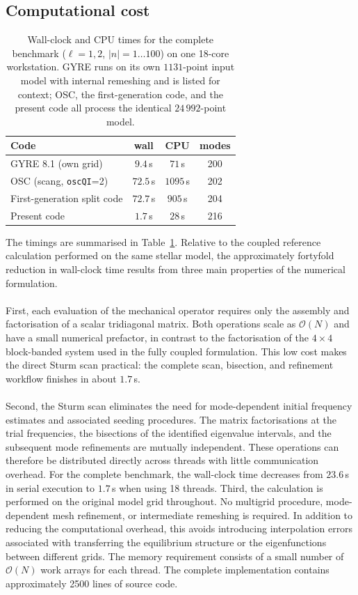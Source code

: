 \documentclass[]{aa}
\begin{document}
\subsection{Computational cost}
\label{sec:performance}
\begin{table} \caption{Wall-clock and CPU times for the complete benchmark ($\ell=1,2$, $|n|=1\dots100$) on one 18-core workstation. GYRE runs on its own $1131$-point input model with internal remeshing and is listed for context; OSC, the first-generation code, and the present code all process the identical $24\,992$-point model.} \label{tab:timing} \centering \begin{tabular}{lccc} \hline\hline Code & wall & CPU & modes \\ \hline GYRE 8.1 (own grid) & $9.4$\,s & $71$\,s & 200 \\ OSC (scang, {\tt oscQI}=2) & $72.5$\,s & $1095$\,s & 202 \\ First-generation split code & $72.7$\,s & $905$\,s & 204 \\ Present code & $1.7$\,s & $28$\,s & 216 \\ \hline\hline \end{tabular} \end{table}
The timings are summarised in Table~\ref{tab:timing}. Relative to the coupled
reference calculation performed on the same stellar model, the approximately
fortyfold reduction in wall-clock time results from three main
properties of the numerical formulation.
\\~\\First, each evaluation of the mechanical operator requires only the assembly
and factorisation of a scalar tridiagonal matrix. Both operations scale as
$\mathcal{O}(N)$ and have a small numerical prefactor, in contrast to the
factorisation of the $4\times4$ block-banded system used in the fully coupled
formulation. This low cost makes the direct Sturm scan practical: the complete
scan, bisection, and refinement workflow finishes in about $1.7$\,s.
\\~\\Second, the Sturm scan eliminates the need for mode-dependent initial
frequency estimates and associated seeding procedures. The matrix
factorisations at the trial frequencies, the bisections of the identified
eigenvalue intervals, and the subsequent mode refinements are mutually
independent. These operations can therefore be distributed directly across
threads with little communication overhead. For the complete benchmark, the
wall-clock time decreases from $23.6$\,s in serial execution to $1.7$\,s
when using 18 threads. Third, the calculation is performed on the original model grid throughout.
No multigrid procedure, mode-dependent mesh refinement, or intermediate
remeshing is required. In addition to reducing the computational overhead,
this avoids introducing interpolation errors associated with transferring
the equilibrium structure or the eigenfunctions between different grids. The memory requirement consists of a small number of
$\mathcal{O}(N)$ work arrays for each thread. The complete implementation
contains approximately 2500 lines of source code.
\end{document}
